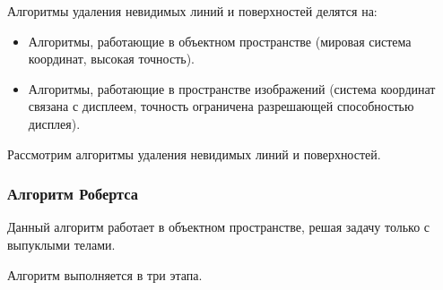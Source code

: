 Алгоритмы удаления невидимых линий и поверхностей делятся на:
\begin{itemize}
	\item Алгоритмы, работающие в объектном пространстве (мировая система координат, высокая точность).
	\item Алгоритмы, работающие в пространстве изображений (система координат связана с дисплеем, точность ограничена разрешающей способностью дисплея).
\end{itemize}
Рассмотрим алгоритмы удаления невидимых линий и поверхностей.

\subsubsection{Алгоритм Робертса}

Данный алгоритм работает в объектном пространстве, решая задачу только с выпуклыми телами.

Алгоритм выполняется в три этапа.

